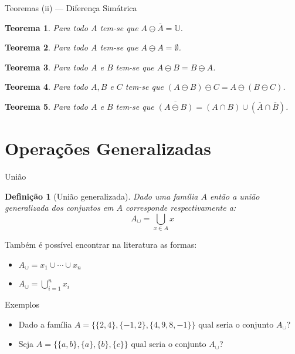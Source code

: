 \documentclass[aspectratio=169]{beamer}
\newtheorem{defi}{Definição}
\newtheorem{teo}{Teorema}
\begin{document}
	\begin{frame}{Teoremas (ii) --- Diferença Simátrica}
		\begin{teo}
			Para todo $A$ tem-se que $A \ominus \overline{A} = \mathbb{U}$.
		\end{teo}
		\begin{teo}
			Para todo $A$ tem-se que $A \ominus A = \emptyset$.
		\end{teo}
		\begin{teo}
			Para todo $A$ e $B$ tem-se que $A \ominus B = B \ominus A$.
		\end{teo}
		\begin{teo}
			Para todo $A, B$ e $C$ tem-se que $(A \ominus B) \ominus C = A \ominus (B \ominus C)$.
		\end{teo}
		\begin{teo}
			Para todo $A$ e $B$ tem-se que $\overline{(A \ominus B)} = (A \cap B) \cup (\overline{A} \cap \overline{B})$.
		\end{teo}
	\end{frame}
	
	\section{Operações Generalizadas}
	
	\begin{frame}{União}
		\begin{defi}[União generalizada]\label{def:UniaoGeneralizadas}
			Dado uma família $A$ então a união generalizada dos conjuntos em $A$ corresponde respectivamente a:
			$$A_\cup = \bigcup_{x \in A} x$$
		\end{defi}
		\pause
		Também é possível encontrar na literatura as formas:
		\begin{itemize}
			\item $\displaystyle A_\cup = x_1 \cup \cdots \cup x_n$
			\item $\displaystyle A_\cup = \bigcup_{i = 1}^n x_i$
		\end{itemize}
	\end{frame}

	\begin{frame}{Exemplos}
		\begin{itemize}
			\item Dado a família $A = \{\{2, 4\}, \{-1, 2\}, \{4, 9, 8, -1\}\}$ qual seria o conjunto $A_\cup$?
			\item Seja $A = \{\{a, b\}, \{a\}, \{b\}, \{c\}\}$ qual seria o conjunto $A_\cup$?
		\end{itemize}
	\end{frame}
	
\end{document}

